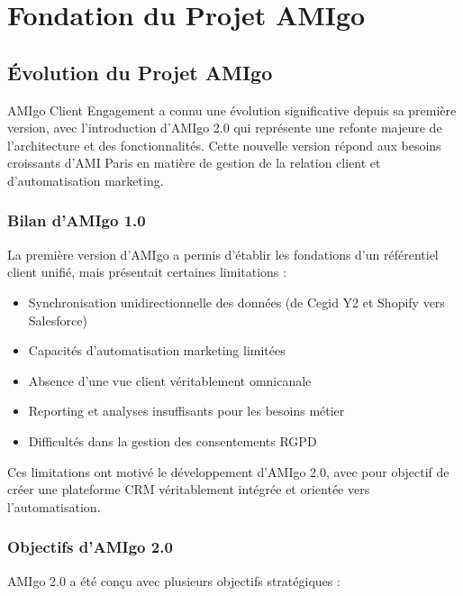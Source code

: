 
\chapter{Fondation du Projet AMIgo}

\section{Évolution du Projet AMIgo}

AMIgo Client Engagement a connu une évolution significative depuis sa première version, avec l'introduction d'AMIgo 2.0 qui représente une refonte majeure de l'architecture et des fonctionnalités. Cette nouvelle version répond aux besoins croissants d'AMI Paris en matière de gestion de la relation client et d'automatisation marketing.

\subsection{Bilan d'AMIgo 1.0}

La première version d'AMIgo a permis d'établir les fondations d'un référentiel client unifié, mais présentait certaines limitations :

\begin{itemize}
    \item Synchronisation unidirectionnelle des données (de Cegid Y2 et Shopify vers Salesforce)
    \item Capacités d'automatisation marketing limitées
    \item Absence d'une vue client véritablement omnicanale
    \item Reporting et analyses insuffisants pour les besoins métier
    \item Difficultés dans la gestion des consentements RGPD
\end{itemize}

Ces limitations ont motivé le développement d'AMIgo 2.0, avec pour objectif de créer une plateforme CRM véritablement intégrée et orientée vers l'automatisation.

\subsection{Objectifs d'AMIgo 2.0}

AMIgo 2.0 a été conçu avec plusieurs objectifs stratégiques :

